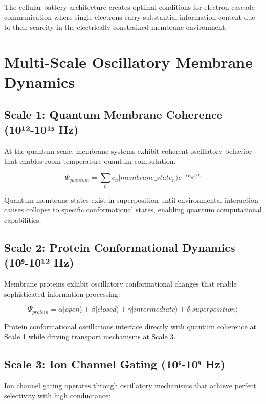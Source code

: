 \documentclass[12pt,a4paper]{article}
\begin{document}
The cellular battery architecture creates optimal conditions for electron cascade communication where single electrons carry substantial information content due to their scarcity in the electrically constrained membrane environment.

\section{Multi-Scale Oscillatory Membrane Dynamics}

\subsection{Scale 1: Quantum Membrane Coherence (10¹²-10¹⁵ Hz)}

At the quantum scale, membrane systems exhibit coherent oscillatory behavior that enables room-temperature quantum computation.

\begin{equation}
\Psi_{quantum} = \sum_n c_n |membrane\_state_n\rangle e^{-iE_n t/\hbar}
\end{equation}

Quantum membrane states exist in superposition until environmental interaction causes collapse to specific conformational states, enabling quantum computational capabilities.

\subsection{Scale 2: Protein Conformational Dynamics (10⁹-10¹² Hz)}

Membrane proteins exhibit oscillatory conformational changes that enable sophisticated information processing:

\begin{equation}
\Psi_{protein} = \alpha|open\rangle + \beta|closed\rangle + \gamma|intermediate\rangle + \delta|superposition\rangle
\end{equation}

Protein conformational oscillations interface directly with quantum coherence at Scale 1 while driving transport mechanisms at Scale 3.

\subsection{Scale 3: Ion Channel Gating (10⁶-10⁹ Hz)}

Ion channel gating operates through oscillatory mechanisms that achieve perfect selectivity with high conductance:
\end{document}
